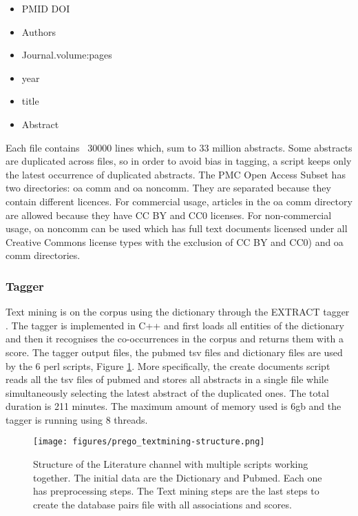 \begin{itemize}
    \item PMID DOI
    \item Authors
    \item Journal.volume:pages
    \item year
    \item title
    \item Abstract
\end{itemize}

Each file contains ~30000 lines which, sum to 33 million abstracts. Some
abstracts are duplicated across files, so in order to avoid bias in tagging,
a script keeps only the latest occurrence of duplicated abstracts.
The PMC Open Access Subset has two directories: oa comm and oa noncomm.
They are separated because they contain different licences. For commercial usage,
articles in the oa comm directory are allowed because they have CC BY and CC0 licenses.
For non-commercial usage, oa noncomm can be used which has full text documents
licensed under all Creative Commons license types with the exclusion of CC BY and CC0)
and oa comm directories. 

   \subsubsection{Tagger}

Text mining is on the corpus using the dictionary through the EXTRACT tagger \parencite{pafilis2016extract, jensen2016one}.
The tagger is implemented in C++ and first loads all entities of the dictionary
and then it recognises the co-occurrences in the corpus and returns them with a score. 
The tagger output files, the pubmed tsv files and dictionary files are used by
the 6 perl scripts, Figure \ref{fig:prego-textmining-structure}. More specifically, 
the create documents script reads all the tsv files of pubmed and stores all abstracts
in a single file while simultaneously selecting the latest abstract of the duplicated ones. 
The total duration is 211 minutes. The maximum amount of memory used is 6gb and the tagger
is running using 8 threads.
   
\begin{figure}[hbt!]
      \centering
      \texttt{[image: figures/prego\_textmining-structure.png]}
      \caption[PREGO analysis methodology]{
         Structure of the Literature channel with multiple scripts working together.
         The initial data are the Dictionary and Pubmed. Each one has preprocessing steps. 
         The Text mining steps are the last steps to create the database pairs file 
         with all associations and scores.
      }
      \label{fig:prego-textmining-structure}
\end{figure}

